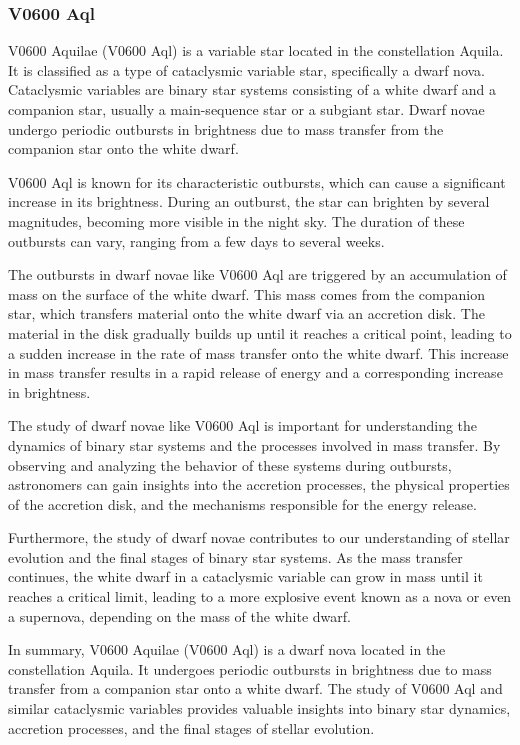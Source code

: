 \subsubsection*{ V0600 Aql }
V0600 Aquilae (V0600 Aql) is a variable star located in the constellation Aquila. It is classified as a type of cataclysmic variable star, specifically a dwarf nova. Cataclysmic variables are binary star systems consisting of a white dwarf and a companion star, usually a main-sequence star or a subgiant star. Dwarf novae undergo periodic outbursts in brightness due to mass transfer from the companion star onto the white dwarf.

V0600 Aql is known for its characteristic outbursts, which can cause a significant increase in its brightness. During an outburst, the star can brighten by several magnitudes, becoming more visible in the night sky. The duration of these outbursts can vary, ranging from a few days to several weeks.

The outbursts in dwarf novae like V0600 Aql are triggered by an accumulation of mass on the surface of the white dwarf. This mass comes from the companion star, which transfers material onto the white dwarf via an accretion disk. The material in the disk gradually builds up until it reaches a critical point, leading to a sudden increase in the rate of mass transfer onto the white dwarf. This increase in mass transfer results in a rapid release of energy and a corresponding increase in brightness.

The study of dwarf novae like V0600 Aql is important for understanding the dynamics of binary star systems and the processes involved in mass transfer. By observing and analyzing the behavior of these systems during outbursts, astronomers can gain insights into the accretion processes, the physical properties of the accretion disk, and the mechanisms responsible for the energy release.

Furthermore, the study of dwarf novae contributes to our understanding of stellar evolution and the final stages of binary star systems. As the mass transfer continues, the white dwarf in a cataclysmic variable can grow in mass until it reaches a critical limit, leading to a more explosive event known as a nova or even a supernova, depending on the mass of the white dwarf.

In summary, V0600 Aquilae (V0600 Aql) is a dwarf nova located in the constellation Aquila. It undergoes periodic outbursts in brightness due to mass transfer from a companion star onto a white dwarf. The study of V0600 Aql and similar cataclysmic variables provides valuable insights into binary star dynamics, accretion processes, and the final stages of stellar evolution.

